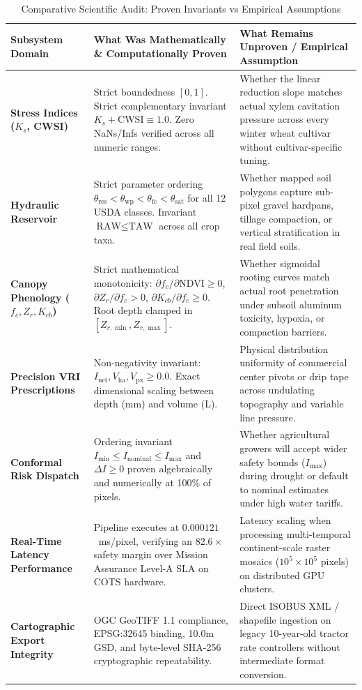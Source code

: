 \documentclass[11pt,a4paper]{article}
\theoremstyle{definition}
\theoremstyle{remark}
\begin{document}
\begin{table}[htbp]
\centering
\caption{Comparative Scientific Audit: Proven Invariants vs Empirical Assumptions}
\label{tab:proven_unproven}
\small
\begin{tabular}{p{3.2cm}p{6.5cm}p{6.5cm}}
\toprule
\textbf{Subsystem Domain} & \textbf{What Was Mathematically \& Computationally Proven} & \textbf{What Remains Unproven / Empirical Assumption} \\
\midrule
\textbf{Stress Indices ($K_s$, CWSI)} & 
Strict boundedness $[0, 1]$. Strict complementary invariant $K_s + \text{CWSI} \equiv 1.0$. Zero NaNs/Infs verified across all numeric ranges. & 
Whether the linear reduction slope matches actual xylem cavitation pressure across every winter wheat cultivar without cultivar-specific tuning. \\
\addlinespace
\textbf{Hydraulic Reservoir} & 
Strict parameter ordering $\theta_{\text{res}} < \theta_{\text{wp}} < \theta_{\text{fc}} < \theta_{\text{sat}}$ for all 12 USDA classes. Invariant $\text{RAW} \le \text{TAW}$ across all crop taxa. & 
Whether mapped soil polygons capture sub-pixel gravel hardpans, tillage compaction, or vertical stratification in real field soils. \\
\addlinespace
\textbf{Canopy Phenology ($f_c, Z_r, K_{cb}$)} & 
Strict mathematical monotonicity: $\partial f_c/\partial \text{NDVI} \ge 0$, $\partial Z_r/\partial f_c > 0$, $\partial K_{cb}/\partial f_c \ge 0$. Root depth clamped in $[Z_{r,\min}, Z_{r,\max}]$. & 
Whether sigmoidal rooting curves match actual root penetration under subsoil aluminum toxicity, hypoxia, or compaction barriers. \\
\addlinespace
\textbf{Precision VRI Prescriptions} & 
Non-negativity invariant: $I_{\text{net}}, V_{\text{ha}}, V_{\text{px}} \ge 0.0$. Exact dimensional scaling between depth (mm) and volume (L). & 
Physical distribution uniformity of commercial center pivots or drip tape across undulating topography and variable line pressure. \\
\addlinespace
\textbf{Conformal Risk Dispatch} & 
Ordering invariant $I_{\min} \le I_{\text{nominal}} \le I_{\max}$ and $\Delta I \ge 0$ proven algebraically and numerically at 100\% of pixels. & 
Whether agricultural growers will accept wider safety bounds ($I_{\max}$) during drought or default to nominal estimates under high water tariffs. \\
\addlinespace
\textbf{Real-Time Latency Performance} & 
Pipeline executes at $0.000121$~ms/pixel, verifying an $82.6\times$ safety margin over Mission Assurance Level-A SLA on COTS hardware. & 
Latency scaling when processing multi-temporal continent-scale raster mosaics ($10^5 \times 10^5$ pixels) on distributed GPU clusters. \\
\addlinespace
\textbf{Cartographic Export Integrity} & 
OGC GeoTIFF 1.1 compliance, EPSG:32645 binding, 10.0m GSD, and byte-level SHA-256 cryptographic repeatability. & 
Direct ISOBUS XML / shapefile ingestion on legacy 10-year-old tractor rate controllers without intermediate format conversion. \\
\bottomrule
\end{tabular}
\end{table}
\end{document}
